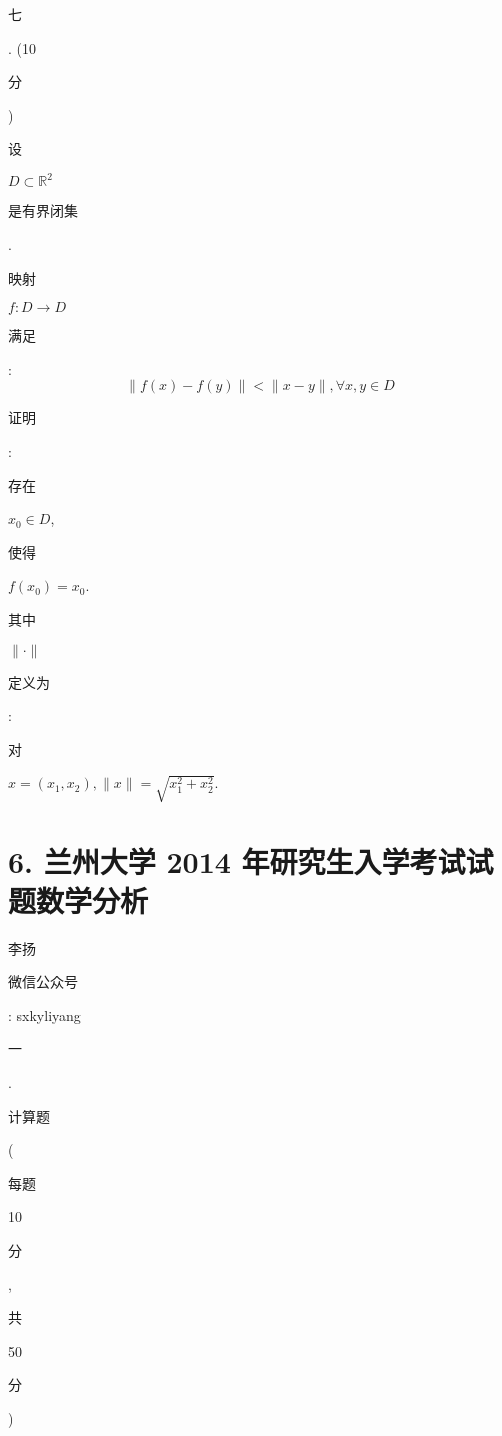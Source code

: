 \documentclass[10pt]{article}
\begin{document}
\begin{CJK}{UTF8}{mj}七\end{CJK}. (10 \begin{CJK}{UTF8}{mj}分\end{CJK}) \begin{CJK}{UTF8}{mj}设\end{CJK} $D \subset \mathbb{R}^{2}$ \begin{CJK}{UTF8}{mj}是有界闭集\end{CJK}. \begin{CJK}{UTF8}{mj}映射\end{CJK} $f: D \rightarrow D$ \begin{CJK}{UTF8}{mj}满足\end{CJK}:
$$
\|f(x)-f(y)\|<\|x-y\|, \forall x, y \in D
$$
\begin{CJK}{UTF8}{mj}证明\end{CJK}: \begin{CJK}{UTF8}{mj}存在\end{CJK} $x_{0} \in D$, \begin{CJK}{UTF8}{mj}使得\end{CJK} $f\left(x_{0}\right)=x_{0}$. \begin{CJK}{UTF8}{mj}其中\end{CJK} $\|\cdot\|$ \begin{CJK}{UTF8}{mj}定义为\end{CJK}: \begin{CJK}{UTF8}{mj}对\end{CJK} $x=\left(x_{1}, x_{2}\right),\|x\|=\sqrt{x_{1}^{2}+x_{2}^{2}}$.

\section{6. 兰州大学 2014 年研究生入学考试试题数学分析}
\begin{CJK}{UTF8}{mj}李扬\end{CJK}

\begin{CJK}{UTF8}{mj}微信公众号\end{CJK}: sxkyliyang

\begin{CJK}{UTF8}{mj}一\end{CJK}. \begin{CJK}{UTF8}{mj}计算题\end{CJK} (\begin{CJK}{UTF8}{mj}每题\end{CJK} 10 \begin{CJK}{UTF8}{mj}分\end{CJK}, \begin{CJK}{UTF8}{mj}共\end{CJK} 50 \begin{CJK}{UTF8}{mj}分\end{CJK})
\end{document}
